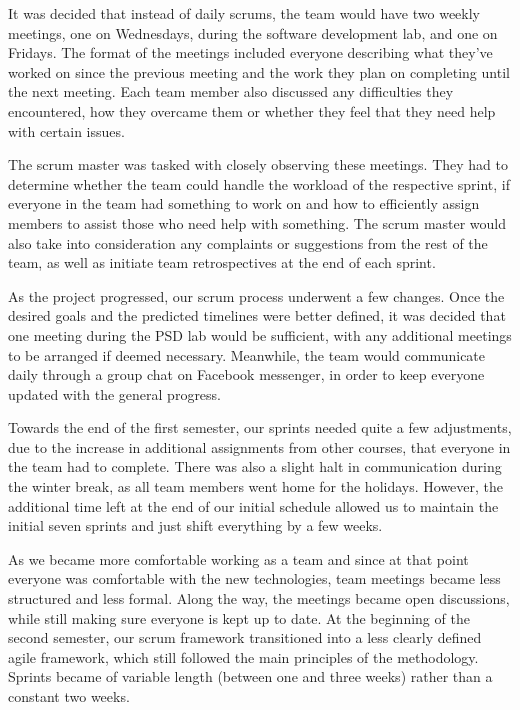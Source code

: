 \documentclass{l3proj}
\begin{document}
 It was decided that instead of daily scrums, the team would have two weekly meetings, one on Wednesdays, during the software development lab, and one on Fridays. The format of the meetings included everyone describing what they've worked on since the previous meeting and the work they plan on completing until the next meeting. Each team member also discussed any difficulties they encountered, how they overcame them or whether they feel that they need help with certain issues.

 The scrum master was tasked with closely observing these meetings. They had to determine whether the team could handle the workload of the respective sprint, if everyone in the team had something to work on and how to efficiently assign members to assist those who need help with something. The scrum master would also take into consideration any complaints or suggestions from the rest of the team, as well as initiate team retrospectives at the end of each sprint.

 As the project progressed, our scrum process underwent a few changes. Once the desired goals and the predicted timelines were better defined, it was decided that one meeting during the PSD lab would be sufficient, with any additional meetings to be arranged if deemed necessary. Meanwhile, the team would communicate daily through a group chat on Facebook messenger, in order to keep everyone updated with the general progress.

 Towards the end of the first semester, our sprints needed quite a few adjustments, due to the increase in additional assignments from other courses, that everyone in the team had to complete. There was also a slight halt in communication during the winter break, as all team members went home for the holidays. However, the additional time left at the end of our initial schedule allowed us to maintain the initial seven sprints and just shift everything by a few weeks.

 As we became more comfortable working as a team and since at that point everyone was comfortable with the new technologies, team meetings became less structured and less formal. Along the way, the meetings became open discussions, while still making sure everyone is kept up to date. At the beginning of the second semester, our scrum framework transitioned into a less clearly defined agile framework, which still followed the main principles of the methodology. Sprints became of variable length (between one and three weeks) rather than a constant two weeks.
\end{document}
